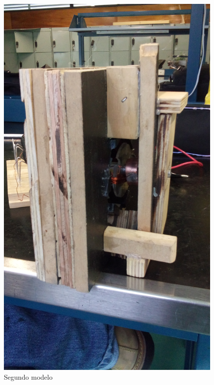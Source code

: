 \begin{figure}[!htbp]
\caption{Segundo modelo}
\centering
\includegraphics [scale=0.10]
{./img/20160301_134958.jpg}
\end{figure}

